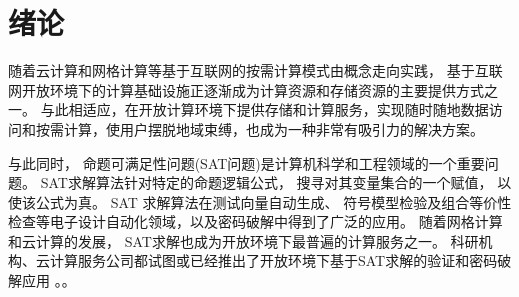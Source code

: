 \chapter{绪论}
%
%

随着云计算和网格计算等基于互联网的按需计算模式由概念走向实践，
基于互联网开放环境下的计算基础设施正逐渐成为计算资源和存储资源的主要提供方式之一。
与此相适应，在开放计算环境下提供存储和计算服务，实现随时随地数据访问和按需计算，使用户摆脱地域束缚，也成为一种非常有吸引力的解决方案。

与此同时，
命题可满足性问题(SAT问题)是计算机科学和工程领域的一个重要问题。
SAT求解算法针对特定的命题逻辑公式，
搜寻对其变量集合的一个赋值，
以使该公式为真。
SAT 求解算法在测试向量自动生成、
符号模型检验及组合等价性检查等电子设计自动化领域，以及密码破解中得到了广泛的应用。
随着网格计算和云计算的发展，
SAT求解也成为开放环境下最普遍的计算服务之一。
科研机构、云计算服务公司都试图或已经推出了开放环境下基于SAT求解的验证和密码破解应用
。。

